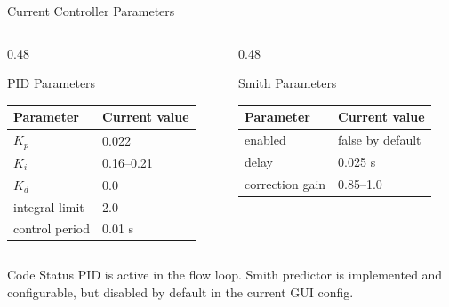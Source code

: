 \documentclass[aspectratio=169,10pt]{beamer}
\begin{document}
\begin{frame}{Current Controller Parameters}
  \begin{columns}[T,onlytextwidth]
    \begin{column}{0.48\textwidth}
      \begin{block}{PID Parameters}
        \begin{tabular}{ll}
          \toprule
          Parameter & Current value \\
          \midrule
          $K_p$ & 0.022 \\
          $K_i$ & 0.16--0.21 \\
          $K_d$ & 0.0 \\
          integral limit & 2.0 \\
          control period & 0.01 s \\
          \bottomrule
        \end{tabular}
      \end{block}
    \end{column}
    \begin{column}{0.48\textwidth}
      \begin{block}{Smith Parameters}
        \begin{tabular}{ll}
          \toprule
          Parameter & Current value \\
          \midrule
          enabled & false by default \\
          delay & 0.025 s \\
          correction gain & 0.85--1.0 \\
          \bottomrule
        \end{tabular}
      \end{block}
    \end{column}
  \end{columns}

  \vspace{0.8em}
  \begin{block}{Code Status}
    PID is active in the flow loop. Smith predictor is implemented and configurable, but disabled by default in the current GUI config.
  \end{block}
\end{frame}
\end{document}
